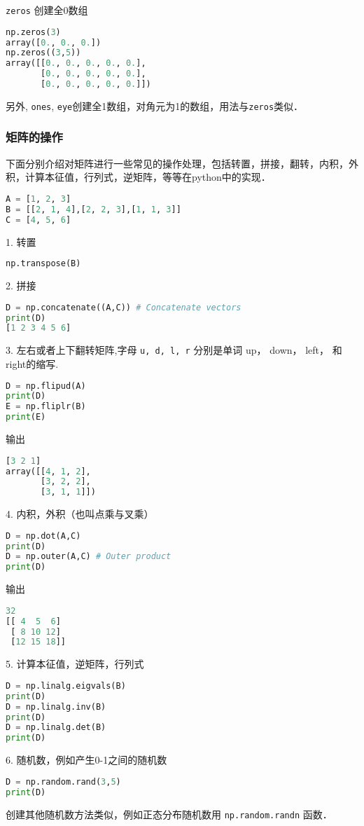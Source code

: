 \verb|zeros| 创建全0数组
\begin{lstlisting}[language=python]
np.zeros(3)
array([0., 0., 0.])
np.zeros((3,5))
array([[0., 0., 0., 0., 0.],
       [0., 0., 0., 0., 0.],
       [0., 0., 0., 0., 0.]])
\end{lstlisting} 
另外, \verb|ones|, \verb|eye|创建全1数组，对角元为1的数组，用法与\verb|zeros|类似．


\subsubsection{矩阵的操作}
下面分别介绍对矩阵进行一些常见的操作处理，包括转置，拼接，翻转，内积，外积，计算本征值，行列式，逆矩阵，等等在python中的实现．
\begin{lstlisting}[language=python]
A = [1, 2, 3]
B = [[2, 1, 4],[2, 2, 3],[1, 1, 3]]
C = [4, 5, 6]
\end{lstlisting}
1. 转置
\begin{lstlisting}[language=python]
np.transpose(B)
\end{lstlisting}
2. 拼接
\begin{lstlisting}[language=python]
D = np.concatenate((A,C)) # Concatenate vectors
print(D)
[1 2 3 4 5 6]
\end{lstlisting}
3. 左右或者上下翻转矩阵,字母 \verb|u, d, l, r| 分别是单词 up， down，  left， 和  right的缩写.
\begin{lstlisting}[language=python]
D = np.flipud(A) 
print(D)
E = np.fliplr(B) 
print(E)
\end{lstlisting}
输出
\begin{lstlisting}[language=python]
[3 2 1]
array([[4, 1, 2],
       [3, 2, 2],
       [3, 1, 1]])
\end{lstlisting}
 4. 内积，外积（也叫点乘与叉乘）
\begin{lstlisting}[language=python]
D = np.dot(A,C) 
print(D)
D = np.outer(A,C) # Outer product
print(D)
\end{lstlisting}
输出
\begin{lstlisting}[language=python]
32
[[ 4  5  6]
 [ 8 10 12]
 [12 15 18]]
\end{lstlisting}
5.  计算本征值，逆矩阵，行列式
\begin{lstlisting}[language=python]
D = np.linalg.eigvals(B) 
print(D)
D = np.linalg.inv(B)
print(D)
D = np.linalg.det(B)
print(D)
\end{lstlisting}
6. 随机数，例如产生0-1之间的随机数
\begin{lstlisting}[language=python]
D = np.random.rand(3,5) 
print(D)
\end{lstlisting}
创建其他随机数方法类似，例如正态分布随机数用 \verb|np.random.randn| 函数．



